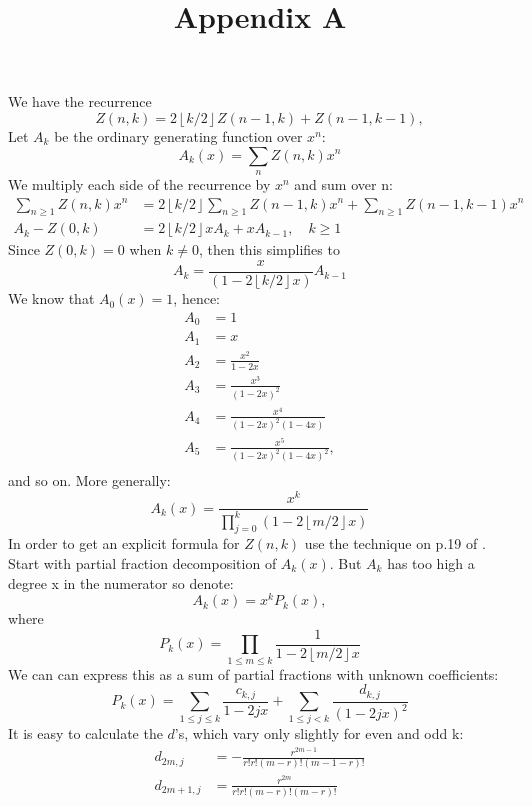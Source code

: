 \documentclass{article}
\newcommand{\floor}[1]{\left\lfloor #1 \right\rfloor}
\begin{document}
\title{Appendix A}
\maketitle
We have the recurrence
$$
Z(n,k) = 2\floor{k/2} Z(n-1,k)+Z(n-1,k-1),
$$
Let $A_k$ be the ordinary generating function over $x^n$:
$$
A_k(x) = \sum_{n} Z(n,k) x^n
$$
We multiply each side of the recurrence by $x^n$ and sum over n:
$$
\begin{aligned}
\sum_{n \geq 1} Z(n,k)x^n &= 2\floor{k/2}\sum_{n \geq 1}Z(n-1,k)x^n + \sum_{n \geq 1} Z(n-1,k-1) x^n \\
A_k -Z(0,k)&=2\floor{k/2}x A_k+x A_{k-1}, \quad k \geq 1
\end{aligned}
$$
Since $Z(0,k) = 0$ when $k \neq 0$, then this simplifies to
$$
A_k = \frac{x}{(1-2\floor{k/2}x)} A_{k-1}
$$
We know that $A_0(x) = 1$, hence:
$$
\begin{aligned}
    A_0 &= 1 \\
    A_1 &= x \\
    A_2 &= \frac{x^2}{1-2x} \\
    A_3 &= \frac{x^3}{(1-2x)^2} \\
    A_4 &= \frac{x^4}{(1-2x)^2 (1-4x)} \\
    A_5 &= \frac{x^5}{(1-2x)^2 (1-4x)^2}, \\
\end{aligned}
$$
and so on. More generally:
$$
A_k(x) = \frac{x^k}{\prod_{j=0}^k(1-2\floor{m/2}x)}
$$
In order to get an explicit formula for $Z(n,k)$ use the technique on p.19 of \cite{wilf_generatingfunctionology_2005}. Start with partial fraction decomposition of $A_k(x)$. But $A_k$ has too high a degree x in the numerator so denote:
$$
A_k(x) = x^kP_k(x),
$$
where
$$
P_k(x) = \prod_{1 \leq m \leq k}\frac{1}{1-2\floor{m/2}x}
$$
We can can express this as a sum of partial fractions with unknown coefficients:
$$
P_k(x) = \sum_{1 \leq j \leq k} \frac{c_{k,j}}{1-2jx} + \sum_{1 \leq j < k} \frac{d_{k,j}}{(1-2jx)^2}
$$
It is easy to calculate the $d$'s, which vary only slightly for even and odd k:
$$
\begin{aligned}
    d_{2m,j} &= -\frac{r^{2m-1}}{r!r!(m-r)!(m-1-r)!} \\
    d_{2m+1,j} &= \frac{r^{2m}}{r!r!(m-r)!(m-r)!} \\
\end{aligned}
$$
\end{document}
